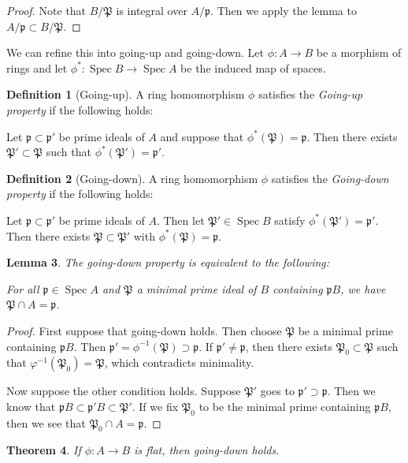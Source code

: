 \documentclass[leqno, openany]{memoir}
\newtheorem{thm}{Theorem}[section]
\newtheorem{lem}[thm]{Lemma}
\theoremstyle{definition}
\newtheorem{defn}[thm]{Definition}
\theoremstyle{remark}
\theoremstyle{plain}
\theoremstyle{definition}
\theoremstyle{remark}
\newcommand{\mf}[1]{\mathfrak{#1}}
\DeclareMathOperator{\Spec}{Spec}
\begin{document}
\begin{proof}
    Note that $B/ \mf{P}$ is integral over $A / \mf{p}$. Then we apply the lemma to $A / \mf{p} \subset B / \mf{P}$.
\end{proof}

We can refine this into going-up and going-down. Let $\phi: A \to B$ be a morphism of rings and let $\phi^*: \Spec B \to \Spec A$ be the induced map of spaces.

\begin{defn}[Going-up]
    A ring homomorphism $\phi$ satisfies the \textit{Going-up property} if the following holds:

    Let $\mf{p} \subset \mf{p}'$ be prime ideals of $A$ and suppose that $\phi^*(\mf{P}) = \mf{p}$. Then there exists $\mf{P}' \subset \mf{P}$ such that $\phi^*(\mf{P}') = \mf{p}'$.
\end{defn}

\begin{defn}[Going-down]
    A ring homomorphism $\phi$ satisfies the \textit{Going-down property} if the following holds:

    Let $\mf{p} \subset \mf{p}'$ be prime ideals of $A$. Then let $\mf{P}' \in \Spec B$ satisfy $\phi^*(\mf{P}') = \mf{p}'$. Then there exists $\mf{P} \subset \mf{P}'$ with $\phi^*(\mf{P}) = \mf{p}$.
\end{defn}

\begin{lem}
    \label{lem:goingdown}
    The going-down property is equivalent to the following:

    For all $\mf{p} \in \Spec A$ and $\mf{P}$ a minimal prime ideal of $B$ containing $\mf{p}B$, we have $\mf{P} \cap A = \mf{p}$.
\end{lem}

\begin{proof}
    First suppose that going-down holds. Then choose $\mf{P}$ be a minimal prime containing $\mf{p}B$. Then $\mf{p}' = \phi^{-1} (\mf{P}) \supset \mf{p}$. If $\mf{p}' \neq \mf{p}$, then there exists $\mf{P}_0 \subset \mf{P}$ such that $\varphi^{-1}(\mf{P}_0) = \mf{P}$, which contradicts minimality.

    Now suppose the other condition holds. Suppose $\mf{P}'$ goes to $\mf{p}' \supset \mf{p}$. Then we know that $\mf{p} B \subset \mf{p}' B \subset \mf{P}'$. If we fix $\mf{P}_0$ to be the minimal prime containing $\mf{p}B$, then we see that $\mf{P}_0 \cap A = \mf{p}$.
\end{proof}

\begin{thm}
    If $\phi: A \to B$ is flat, then going-down holds.
\end{thm}
\end{document}
